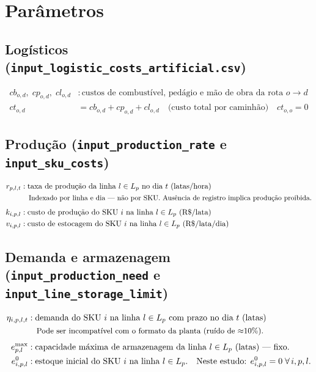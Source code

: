 \documentclass[12pt, a4paper]{article}
\begin{document}
\section{Par\^{a}metros}

\subsection*{Log\'{i}sticos \textnormal{\small(\texttt{input\_logistic\_costs\_artificial.csv})}}

\begin{align*}
  cb_{o,d},\; cp_{o,d},\; cl_{o,d} &: \text{custos de combust\'{i}vel, ped\'{a}gio e m\~{a}o de obra da rota } o \to d \\
  ct_{o,d} &= cb_{o,d} + cp_{o,d} + cl_{o,d} \quad \text{(custo total por caminh\~{a}o)} \quad ct_{o,o} = 0
\end{align*}

\subsection*{Produ\c{c}\~{a}o \textnormal{\small(\texttt{input\_production\_rate} e \texttt{input\_sku\_costs})}}

\begin{align*}
  r_{p,l,t}   &: \text{taxa de produ\c{c}\~{a}o da linha } l \in L_p \text{ no dia } t \text{ (latas/hora)} \\
               &\quad \text{\small Indexado por linha e dia --- n\~{a}o por SKU. Aus\^{e}ncia de registro implica produ\c{c}\~{a}o proibida.} \\[4pt]
  k_{i,p,l}   &: \text{custo de produ\c{c}\~{a}o do SKU } i \text{ na linha } l \in L_p \text{ (R\$/lata)} \\
  v_{i,p,l}   &: \text{custo de estocagem do SKU } i \text{ na linha } l \in L_p \text{ (R\$/lata/dia)}
\end{align*}

\subsection*{Demanda e armazenagem \textnormal{\small(\texttt{input\_production\_need} e \texttt{input\_line\_storage\_limit})}}

\begin{align*}
  \eta_{i,p,l,t}  &: \text{demanda do SKU } i \text{ na linha } l \in L_p \text{ com prazo no dia } t \text{ (latas)} \\
                   &\quad \text{\small Pode ser incompat\'{i}vel com o formato da planta (ru\'{i}do de $\approx$10\%).} \\[4pt]
  e^{\max}_{p,l}  &: \text{capacidade m\'{a}xima de armazenagem da linha } l \in L_p \text{ (latas) --- fixo.} \\
  e^{0}_{i,p,l}   &: \text{estoque inicial do SKU } i \text{ na linha } l \in L_p. \quad
                      \text{Neste estudo: } e^{0}_{i,p,l} = 0 \;\forall\, i,p,l.
\end{align*}
\end{document}
